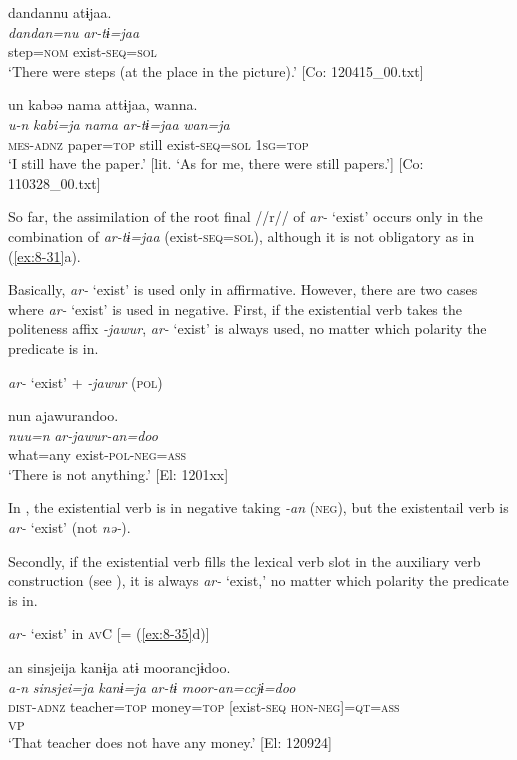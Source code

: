 \ea\label{ex:8-31}
\ea
{\TM}
\glll  dandannu  atɨjaa.\\
\textit{dandan=nu}  \textit{ar-tɨ=jaa}\\
step=\textsc{nom}  exist-\textsc{seq}=\textsc{sol}\\
\glt ‘There were steps (at the place in the picture).’ [Co: 120415\_00.txt]

\ex
{\TM}
\glll  un  kabəə  nama  attɨjaa,  wanna.\\
\textit{u-n}  \textit{kabi=ja}  \textit{nama}  \textit{ar-tɨ=jaa}  \textit{wan=ja}\\
\textsc{mes}-\textsc{adnz}  paper=\textsc{top}  still  exist-\textsc{seq}=\textsc{sol}  1\textsc{sg}=\textsc{top}\\
\glt ‘I still have the paper.’ [lit. ‘As for me, there were still papers.’]       [Co: 110328\_00.txt]
\z
\z

So far, the assimilation of the root final //r// of \textit{ar-} ‘exist’ occurs only in the combination of \textit{ar-tɨ=jaa} (exist-\textsc{seq}=\textsc{sol}), although it is not obligatory as in (\ref{ex:8-31}a).

  Basically, \textit{ar-} ‘exist’ is used only in affirmative. However, there are two cases where \textit{ar-} ‘exist’ is used in negative. First, if the existential verb takes the politeness affix \textit{-jawur}, \textit{ar-} ‘exist’ is always used, no matter which polarity the predicate is in.

\ea\label{ex:8-32}
  \textit{ar-} ‘exist’ + \textit{-jawur} (\textsc{pol})

  {\TM}
\glll  nun  ajawurandoo.\\
\textit{nuu=n}  \textit{ar-jawur-an=doo}\\
    what=any  exist-\textsc{pol}-\textsc{neg}=\textsc{ass}\\
\glt ‘There is not anything.’ [El: 1201xx]
\z

In , the existential verb is in negative taking \textit{-an} (\textsc{neg}), but the existentail verb is \textit{ar-} ‘exist’ (not \textit{nə-}).

  Secondly, if the existential verb fills the lexical verb slot in the auxiliary verb construction (see ), it is always \textit{ar-} ‘exist,’ no matter which polarity the predicate is in.

\ea\label{ex:8-33}
  \textit{ar-} ‘exist’ in \textsc{av}C [= (\ref{ex:8-35}d)]

  {\TM}
\glll  an  sinsjeija  kanɨja  atɨ  moorancjɨdoo.\\
\textit{a-n}  \textit{sinsjei=ja}  \textit{kanɨ=ja}  \textit{ar-tɨ}  \textit{moor-an=ccjɨ=doo}\\
    \textsc{dist}-\textsc{adnz}  teacher=\textsc{top}  money=\textsc{top}  [exist-\textsc{seq}  \textsc{hon}-\textsc{neg}]=\textsc{qt}=\textsc{ass}\\
          [Lex. verb  Aux. verb]\textsubscript{VP}\\
\glt ‘That teacher does not have any money.’ [El: 120924]
\z

